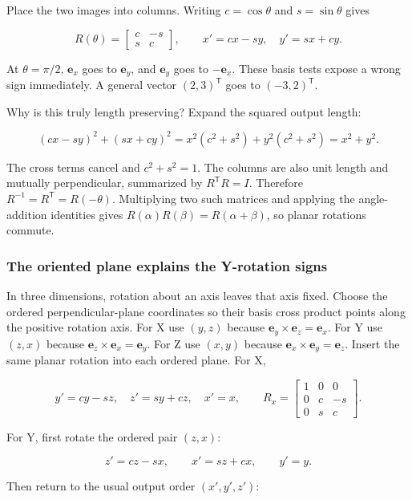 Place the two images into columns. Writing \(c=\cos\theta\) and \(s=\sin\theta\) gives

\[
R(\theta)=\begin{bmatrix}c&-s\\s&c\end{bmatrix},\qquad
x'=cx-sy,\quad y'=sx+cy.
\]

At \(\theta=\pi/2\), \(\mathbf e_x\) goes to \(\mathbf e_y\), and \(\mathbf e_y\) goes to \(-\mathbf e_x\). These basis tests expose a wrong sign immediately. A general vector \((2,3)^{\mathsf T}\) goes to \((-3,2)^{\mathsf T}\).

Why is this truly length preserving? Expand the squared output length:

\[
(cx-sy)^2+(sx+cy)^2
=x^2(c^2+s^2)+y^2(c^2+s^2)=x^2+y^2.
\]

The cross terms cancel and \(c^2+s^2=1\). The columns are also unit length and mutually perpendicular, summarized by \(R^{\mathsf T}R=I\). Therefore \(R^{-1}=R^{\mathsf T}=R(-\theta)\). Multiplying two such matrices and applying the angle-addition identities gives \(R(\alpha)R(\beta)=R(\alpha+\beta)\), so planar rotations commute.

\subsubsection{The oriented plane explains the Y-rotation signs}\label{01-foundations-i-ch018-the-oriented-plane-explains-the-y-rotation-signs}

In three dimensions, rotation about an axis leaves that axis fixed. Choose the ordered perpendicular-plane coordinates so their basis cross product points along the positive rotation axis. For X use \((y,z)\) because \(\mathbf e_y\times\mathbf e_z=\mathbf e_x\). For Y use \((z,x)\) because \(\mathbf e_z\times\mathbf e_x=\mathbf e_y\). For Z use \((x,y)\) because \(\mathbf e_x\times\mathbf e_y=\mathbf e_z\). Insert the same planar rotation into each ordered plane. For X,

\[
y'=cy-sz,\quad z'=sy+cz,\quad x'=x,
\qquad
R_x=\begin{bmatrix}1&0&0\\0&c&-s\\0&s&c\end{bmatrix}.
\]

For Y, first rotate the ordered pair \((z,x)\):

\[
z'=cz-sx,\qquad x'=sz+cx,\qquad y'=y.
\]

Then return to the usual output order \((x',y',z')\):

